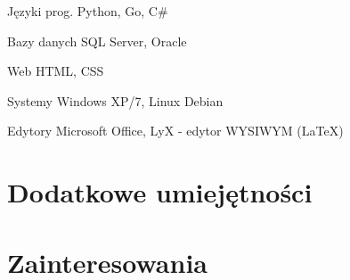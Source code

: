 \documentclass[11pt,a4paper,sans,polish]{moderncv}   %
\begin{document}
\cvitemwithcomment
	{Języki prog.}
	{Python, Go, C\#}{}

\cvitemwithcomment
	{Bazy danych}
	{SQL Server, Oracle}{}

\cvitemwithcomment
	{Web}
	{HTML, CSS}{}

\cvitemwithcomment
	{Systemy}
	{Windows XP/7, Linux Debian}{}

\cvitemwithcomment
	{Edytory}
	{Microsoft Office, LyX - edytor WYSIWYM (\LaTeX{})}{}


\section{Dodatkowe umiejętności}



\section{Zainteresowania}



\thispagestyle{zgoda}
\end{document}
